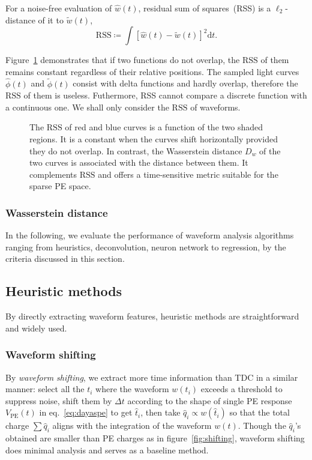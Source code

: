 For a noise-free evaluation of $\hat{w}(t)$, residual sum of squares~(RSS) is a $\ell_2$-distance of it to $\tilde{w}(t)$,
\begin{equation}
  \label{eq:rss}
  \mathrm{RSS} \coloneqq\int\left[\hat{w}(t) - \tilde{w}(t)\right]^2\mathrm{d}t.
\end{equation}

Figure~\ref{fig:l2} demonstrates that if two functions do not overlap, the $\mathrm{RSS}$ of them remains constant regardless of their relative positions.  The sampled light curves $\hat{\phi}(t)$ and $\tilde{\phi}(t)$ consist with delta functions and hardly overlap, therefore the $\mathrm{RSS}$ of them is useless.  Futhermore, RSS cannot compare a discrete function with a continuous one.  We shall only consider the $\mathrm{RSS}$ of waveforms.

\begin{figure}[H]
  \centering
  \resizebox{0.6\textwidth}{!}{}
  \caption{\label{fig:l2} The $\mathrm{RSS}$ of red and blue curves is a function of the two shaded regions. It is a constant when the curves shift horizontally provided they do not overlap.  In contrast, the Wasserstein distance $D_w$ of the two curves is associated with the distance between them.  It complements $\mathrm{RSS}$ and offers a time-sensitive metric suitable for the sparse PE space.}
\end{figure}

\subsubsection{Wasserstein distance}
\label{sec:W-dist}



In the following, we  evaluate the performance of waveform analysis algorithms ranging from heuristics, deconvolution, neuron network to regression, by the criteria discussed in this section.

\subsection{Heuristic methods}
By directly extracting waveform features, heuristic methods are straightforward and widely used. 

\subsubsection{Waveform shifting}
\label{sec:shifting}
By \textit{waveform shifting}, we extract more time information than TDC in a similar manner: select all the $t_i$ where the waveform $w(t_i)$ exceeds a threshold to suppress noise, shift them by $\Delta t$ according to the shape of single PE response $V_\mathrm{PE}(t)$ in eq.~\eqref{eq:dayaspe} to get $\hat{t}_i$, then take $\hat{q}_i \propto w(\hat{t}_i)$ so that the total charge $\sum \hat{q}_i$ aligns with the integration of the waveform $w(t)$.  Though the $\hat{q}_i$'s obtained are smaller than PE charges as in figure~\ref{fig:shifting}, waveform shifting does minimal analysis and serves as a baseline method.

